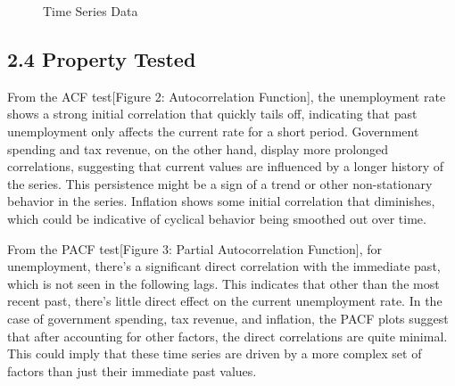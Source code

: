 \documentclass[
  letterpaper,
  DIV=11,
  numbers=noendperiod]{scrartcl}
\begin{document}
\begin{figure}

\begin{minipage}[t]{\linewidth}

{\centering 


\caption{Time Series Data}

}

\end{minipage}%

\end{figure}

\hypertarget{property-tested}{%
\subsection{2.4 Property Tested}\label{property-tested}}

From the ACF test{[}Figure 2: Autocorrelation Function{]}, the
unemployment rate shows a strong initial correlation that quickly tails
off, indicating that past unemployment only affects the current rate for
a short period. Government spending and tax revenue, on the other hand,
display more prolonged correlations, suggesting that current values are
influenced by a longer history of the series. This persistence might be
a sign of a trend or other non-stationary behavior in the series.
Inflation shows some initial correlation that diminishes, which could be
indicative of cyclical behavior being smoothed out over time.

From the PACF test{[}Figure 3: Partial Autocorrelation Function{]}, for
unemployment, there's a significant direct correlation with the
immediate past, which is not seen in the following lags. This indicates
that other than the most recent past, there's little direct effect on
the current unemployment rate. In the case of government spending, tax
revenue, and inflation, the PACF plots suggest that after accounting for
other factors, the direct correlations are quite minimal. This could
imply that these time series are driven by a more complex set of factors
than just their immediate past values.
\end{document}
